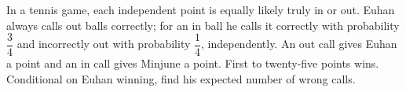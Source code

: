 In a tennis game, each independent point is equally likely truly in or out. Euhan always calls out balls correctly; for an in ball he calls it correctly with probability $\dfrac{3}{4}$ and incorrectly out with probability $\dfrac{1}{4}$, independently. An out call gives Euhan a point and an in call gives Minjune a point. First to twenty-five points wins. Conditional on Euhan winning, find his expected number of wrong calls.
